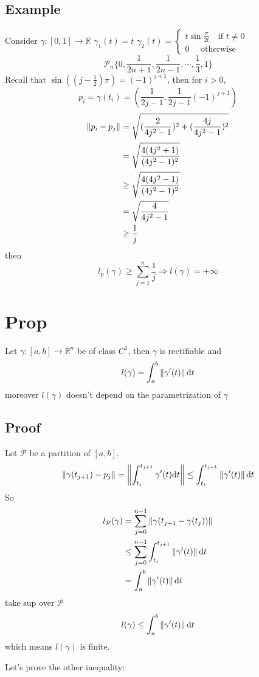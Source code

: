 \documentclass{book}
\begin{document}
\subsection{Example}
Consider $\gamma:[0,1]\rightarrow\mathbb{R}$ $\gamma_1(t)=t$ $\gamma_2(t)=\begin{cases}
    t\sin\frac{\pi}{2t}\quad \text{if }t\neq0\\0\quad\text{ otherwise}
\end{cases}$
$$\mathcal{P}_n\{0,\frac{1}{2n+1},\frac{1}{2n-1},\cdots,\frac{1}{3},1\}$$
Recall that $\sin((j-\frac{1}{2})\pi)=(-1)^{j+1}$, then for $i>0$, $$p_i=\gamma(t_i)=\left(\frac{1}{2j-1},\frac{1}{2j-1}(-1)^{j+1}\right)$$
$$
\begin{aligned}
    \left\lVert p_i-p_j \right\rVert&=\sqrt{(\frac{2}{4j^2-1})^2+(\frac{4j}{4j^2-1})^2}\\
    &=\sqrt{\frac{4(4j^2+1)}{(4j^2-1)^2}}\\
    &\geq\sqrt{\frac{4(4j^2-1)}{(4j^2-1)^2}}\\
    &=\sqrt{\frac{4}{4j^2-1}}\\
    &\geq\frac{1}{j}
\end{aligned}
$$
then $$l_p(\gamma)\geq\sum\limits_{j=1}^n\frac{1}{j}\Rightarrow l(\gamma)=+\infty$$
\section{Prop}
Let $\gamma:[a,b]\rightarrow\mathbb{R}^n$ be of class $C^1$, then $\gamma$ is rectifiable and $$l(\gamma)=\int_a^b\left\lVert \gamma'(t) \right\rVert\text{d}t$$
moreover $l(\gamma)$ doesn't depend on the parametrization of $\gamma$
\subsection*{Proof}
Let $\mathcal{P}$ be a partition of $[a,b]$. $$\left\lVert \gamma(t_{j+1})-p_j \right\rVert=\left\lVert \int_{t_i}^{t_{j+1}}\gamma'(t)\text{d}t \right\rVert\leq\int_{t_i}^{t_{j+1}}\left\lVert \gamma'(t) \right\rVert\text{d}t$$
So 
$$
\begin{aligned}
    l_{\mathcal{P}}(\gamma)&=\sum\limits_{j=0}^{n-1}\left\lVert \gamma(t_{j+1}-\gamma(t_j)) \right\rVert\\
    &\leq\sum\limits_{j=0}^{n-1}\int_{t_i}^{t_{j+1}}\left\lVert \gamma'(t) \right\rVert\text{d}t\\
    &=\int_a^b\left\lVert \gamma'(t) \right\rVert\text{d}t
\end{aligned}
$$
take sup over $\mathcal P$
$$l(\gamma)\leq\int_a^b\left\lVert \gamma'(t) \right\rVert\text{d}t$$
which means $l(\gamma)$ is finite.

Let's prove the other inequality:
\end{document}
